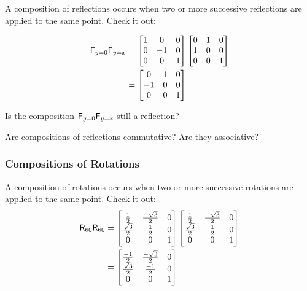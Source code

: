 A composition of reflections occurs when two or more successive
reflections are applied to the same point. Check it out:

\begin{align*}
\mathsf{F}_{y=0}\mathsf{F}_{y=x} &= \begin{bmatrix}
1 &  0 & 0\\
0 & -1 & 0\\
0 &  0 & 1
\end{bmatrix}
\begin{bmatrix}
0 & 1 & 0\\
1 & 0 & 0\\
0 & 0 & 1
\end{bmatrix}\\
&= \begin{bmatrix}
 0 & 1 & 0\\
-1 & 0 & 0\\
 0 & 0 & 1
\end{bmatrix}
\end{align*}


\begin{question}
Is the composition $\mathsf{F}_{y=0}\mathsf{F}_{y=x}$ still a reflection?
\end{question}
\QM

\begin{question}
Are compositions of reflections commutative?  Are they
associative?
\end{question}
\QM



\subsubsection{Compositions of Rotations}


A composition of rotations occurs when two or more successive
rotations are applied to the same point. Check it out: 
\begin{align*}
\mathsf{R}_{60}\mathsf{R}_{60} &= \begin{bmatrix}
\frac{1}{2} & \frac{-\sqrt{3}}{2} & 0\\
\frac{\sqrt{3}}{2} & \frac{1}{2} & 0\\
0 & 0 & 1
\end{bmatrix}
\begin{bmatrix}
\frac{1}{2} & \frac{-\sqrt{3}}{2} & 0\\
\frac{\sqrt{3}}{2} & \frac{1}{2} & 0\\
0 & 0 & 1
\end{bmatrix}\\
&= \begin{bmatrix}
\frac{-1}{2} & \frac{-\sqrt{3}}{2} & 0\\
\frac{\sqrt{3}}{2} & \frac{-1}{2} & 0\\
0 & 0 & 1
\end{bmatrix}
\end{align*}

